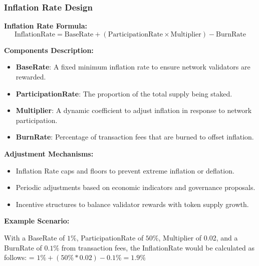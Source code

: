 \documentclass{beamer}
\begin{document}
\begin{frame}
\frametitle{Inflation Rate Design}
\scriptsize
\textbf{Inflation Rate Formula:}
\begin{equation}
\text{InflationRate} = \text{BaseRate} + (\text{ParticipationRate} \times \text{Multiplier}) - \text{BurnRate}
\end{equation}

\textbf{Components Description:}
\begin{itemize}
  \item \textbf{BaseRate}: A fixed minimum inflation rate to ensure network validators are rewarded.
  \item \textbf{ParticipationRate}: The proportion of the total supply being staked.
  \item \textbf{Multiplier}: A dynamic coefficient to adjust inflation in response to network participation.
  \item \textbf{BurnRate}: Percentage of transaction fees that are burned to offset inflation.
\end{itemize}

\textbf{Adjustment Mechanisms:}
\begin{itemize}
  \item Inflation Rate caps and floors to prevent extreme inflation or deflation.
  \item Periodic adjustments based on economic indicators and governance proposals.
  \item Incentive structures to balance validator rewards with token supply growth.
\end{itemize}

\textbf{Example Scenario:}

  With a BaseRate of $1\%$, ParticipationRate of $50\%$, Multiplier of 0.02, and a BurnRate of $0.1\%$ from transaction fees, the InflationRate would be calculated as follows:
   = $1\% + (50\% * 0.02) - 0.1\% = 1.9\%$

\end{frame}
\end{document}
